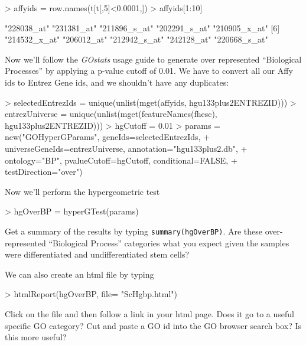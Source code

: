 \documentclass[12pt]{article}
\newcommand{\code}[1]{{\texttt{#1}}}
\begin{document}
\begin{Schunk}
\begin{Sinput}
> affyids = row.names(t[t[,5]<0.0001,])
> affyids[1:10]
\end{Sinput}
\begin{Soutput}
 [1] "228038_at"   "231381_at"   "211896_s_at" "202291_s_at" "210905_x_at"
 [6] "214532_x_at" "206012_at"   "212942_s_at" "242128_at"   "220668_s_at"
\end{Soutput}
\end{Schunk}

Now we'll follow the {\it GOstats} usage guide to generate over represented ``Biological Processes'' by applying a p-value cutoff of 0.01.  We have to convert all our Affy ids to Entrez Gene ids, and we shouldn't have any duplicates:

\begin{Schunk}
\begin{Sinput}
> selectedEntrezIds = unique(unlist(mget(affyids, hgu133plus2ENTREZID)))
> entrezUniverse = unique(unlist(mget(featureNames(fhesc), hgu133plus2ENTREZID)))
> hgCutoff = 0.01
> params = new("GOHyperGParams", geneIds=selectedEntrezIds,
+ universeGeneIds=entrezUniverse, annotation="hgu133plus2.db",
+ ontology="BP", pvalueCutoff=hgCutoff, conditional=FALSE,
+ testDirection="over") 
\end{Sinput}
\end{Schunk}

Now we'll perform the hypergeometric test
\begin{Schunk}
\begin{Sinput}
> hgOverBP = hyperGTest(params)
\end{Sinput}
\end{Schunk}

Get a summary of the results by typing \code{summary(hgOverBP)}.  Are these over-represented ``Biological Process'' categories what you expect given the samples were differentiated and undifferentiated stem cells?    

We can also create an html file by typing

\begin{Schunk}
\begin{Sinput}
> htmlReport(hgOverBP, file= "ScHgbp.html")
\end{Sinput}
\end{Schunk}

Click on the file and then follow a link in your html page.  Does it go to a useful specific GO category?  Cut and paste a GO id into the GO browser search box?  Is this more useful?
\end{document}
